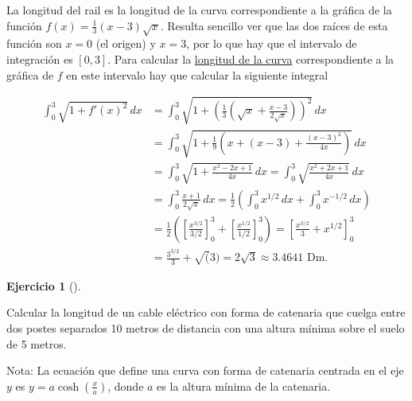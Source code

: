 \documentclass[
  spanish,
  a4paper,
]{scrreport}
\theoremstyle{definition}
\newtheorem{exercise}{Ejercicio}[chapter]
\theoremstyle{remark}
\begin{document}
\begin{tcolorbox}[enhanced jigsaw, arc=.35mm, bottomrule=.15mm, bottomtitle=1mm, breakable, colback=white, colbacktitle=quarto-callout-tip-color!10!white, colframe=quarto-callout-tip-color-frame, coltitle=black, left=2mm, leftrule=.75mm, opacityback=0, opacitybacktitle=0.6, rightrule=.15mm, title=\textcolor{quarto-callout-tip-color}{\faLightbulb}\hspace{0.5em}{Solución}, titlerule=0mm, toprule=.15mm, toptitle=1mm]

La longitud del rail es la longitud de la curva correspondiente a la
gráfica de la función \(f(x)=\frac{1}{3}(x-3)\sqrt{x}\). Resulta
sencillo ver que las dos raíces de esta función son \(x=0\) (el origen)
y \(x=3\), por lo que hay que el intervalo de integración es \([0,3]\).
Para calcular la
\href{https://aprendeconalf.es/analisis-manual/08-integrales.html\#c\%C3\%A1lculo-de-la-longitud-de-una-curva}{longitud
de la curva} correspondiente a la gráfica de \(f\) en este intervalo hay
que calcular la siguiente integral

\begin{align*}
\int_0^3 \sqrt{1+f'(x)^2}\,dx 
&= \int_0^3 \sqrt{1+\left(\frac{1}{3}\left(\sqrt{x}+\frac{x-3}{2\sqrt{x}}\right)\right)^2}\,dx \\
&= \int_0^3 \sqrt{1+\frac{1}{9}\left(x+(x-3)+\frac{(x-3)^2}{4x}\right)}\,dx \\
&= \int_0^3 \sqrt{1+\frac{x^2-2x+1}{4x}}\,dx 
= \int_0^3 \sqrt{\frac{x^2+2x+1}{4x}}\,dx \\
&= \int_0^3 \frac{x+1}{2\sqrt{x}}\,dx 
= \frac{1}{2}\left(\int_0^3 x^{1/2}\,dx + \int_0^3 x^{-1/2}\,dx\right) \\
&= \frac{1}{2}\left(\left[\frac{x^{3/2}}{3/2}\right]_0^3 + \left[\frac{x^{1/2}}{1/2}\right]_0^3\right) 
= \left[\frac{x^{3/2}}{3}+x^{1/2}\right]_0^3 \\ 
&= \frac{3^{3/2}}{3}+\sqrt(3)
= 2\sqrt{3}
\approx 3.4641 \mbox{ Dm}.
\end{align*}

\end{tcolorbox}

\begin{exercise}[]\protect\hypertarget{exr-longitud-catenaria}{}\label{exr-longitud-catenaria}

Calcular la longitud de un cable eléctrico con forma de catenaria que
cuelga entre dos postes separados 10 metros de distancia con una altura
mínima sobre el suelo de 5 metros.

Nota: La ecuación que define una curva con forma de catenaria centrada
en el eje \(y\) es \(y=a\cosh\left(\frac{x}{a}\right)\), donde \(a\) es
la altura mínima de la catenaria.

\end{exercise}
\end{document}
